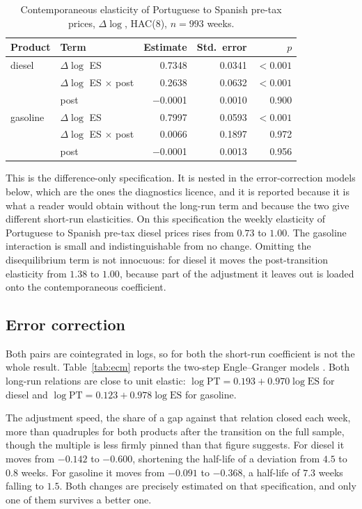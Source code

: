 \documentclass[11pt,a4paper]{article}
\begin{document}
\begin{table}[htbp]
\centering
\caption{Contemporaneous elasticity of Portuguese to Spanish pre-tax prices,
$\Delta \log$, HAC(8), $n=993$ weeks.}
\label{tab:price}
\begin{tabular}{llrrr}
\toprule
Product & Term & Estimate & Std.\ error & $p$ \\
\midrule
diesel & $\Delta \log$ ES & 0.7348 & 0.0341 & $<0.001$ \\
 & $\Delta \log$ ES $\times$ post & 0.2638 & 0.0632 & $<0.001$ \\
 & post & $-$0.0001 & 0.0010 & 0.900 \\
gasoline & $\Delta \log$ ES & 0.7997 & 0.0593 & $<0.001$ \\
 & $\Delta \log$ ES $\times$ post & 0.0066 & 0.1897 & 0.972 \\
 & post & $-$0.0001 & 0.0013 & 0.956 \\
\bottomrule
\end{tabular}
\end{table}

This is the difference-only specification. It is nested in the error-correction models below,
which are the ones the diagnostics licence, and it is reported because it is what a reader would
obtain without the long-run term and because the two give different short-run elasticities. On
this specification the weekly elasticity of Portuguese to Spanish pre-tax diesel prices rises
from $0.73$ to $1.00$. The gasoline interaction is small and indistinguishable from no change.
Omitting the disequilibrium term is not innocuous: for diesel it moves the post-transition
elasticity from $1.38$ to $1.00$, because part of the adjustment it leaves out is loaded onto
the contemporaneous coefficient.

\subsection{Error correction}
\label{sec:ecm}

Both pairs are cointegrated in logs, so for both the short-run coefficient is not the whole
result. Table~\ref{tab:ecm} reports the two-step Engle--Granger models
\citep{engle1987cointegration}. Both long-run relations
are close to unit elastic: $\log \text{PT} = 0.193 + 0.970 \log \text{ES}$ for diesel and
$\log \text{PT} = 0.123 + 0.978 \log \text{ES}$ for gasoline.

The adjustment speed, the share of a gap against that relation closed each week, more than
quadruples for both products after the transition on the full sample, though the multiple is
less firmly pinned than that figure suggests. For diesel it moves from $-0.142$ to $-0.600$,
shortening the half-life of a deviation from $4.5$ to $0.8$ weeks. For gasoline it moves from
$-0.091$ to $-0.368$, a half-life of $7.3$ weeks falling to $1.5$. Both changes are precisely
estimated on that specification, and only one of them survives a better one.
\end{document}
